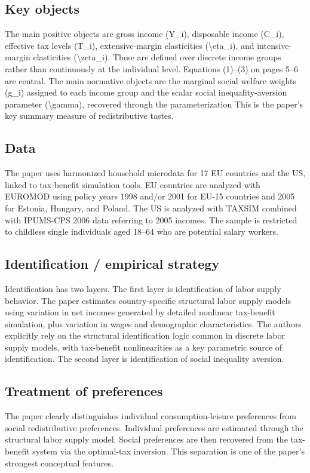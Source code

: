 \documentclass[11pt,a4paper]{article}
\begin{document}
\subsection*{Key objects}
The main positive objects are gross income (Y\_i), disposable income (C\_i), effective tax levels (T\_i), extensive-margin elasticities (\textbackslash{}eta\_i), and intensive-margin elasticities (\textbackslash{}zeta\_i). These are defined over discrete income groups rather than continuously at the individual level. Equations (1)–(3) on pages 5–6 are central. The main normative objects are the marginal social welfare weights (g\_i) assigned to each income group and the scalar social inequality-aversion parameter (\textbackslash{}gamma), recovered through the parameterization This is the paper’s key summary measure of redistributive tastes.

\subsection*{Data}
The paper uses harmonized household microdata for 17 EU countries and the US, linked to tax-benefit simulation tools. EU countries are analyzed with EUROMOD using policy years 1998 and/or 2001 for EU-15 countries and 2005 for Estonia, Hungary, and Poland. The US is analyzed with TAXSIM combined with IPUMS-CPS 2006 data referring to 2005 incomes. The sample is restricted to childless single individuals aged 18–64 who are potential salary workers.

\subsection*{Identification / empirical strategy}
Identification has two layers. The first layer is identification of labor supply behavior. The paper estimates country-specific structural labor supply models using variation in net incomes generated by detailed nonlinear tax-benefit simulation, plus variation in wages and demographic characteristics. The authors explicitly rely on the structural identification logic common in discrete labor supply models, with tax-benefit nonlinearities as a key parametric source of identification. The second layer is identification of social inequality aversion.

\subsection*{Treatment of preferences}
The paper clearly distinguishes individual consumption-leisure preferences from social redistributive preferences. Individual preferences are estimated through the structural labor supply model. Social preferences are then recovered from the tax-benefit system via the optimal-tax inversion. This separation is one of the paper’s strongest conceptual features.
\end{document}
